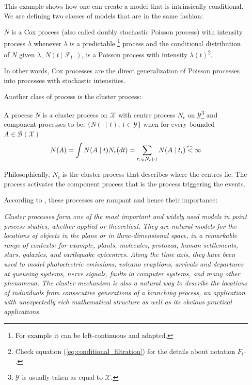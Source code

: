 This example shows how one can create a model that is intrinsically conditional. We are defining two classes of models that are in the same fashion:


\begin{definition}
$N$ is a Cox process (also called doubly stochastic Poisson process) with intensity process $\lambda$ whenever $\lambda$ is a predictable \footnote{For example it can be left-continuous and adapted.} process and the conditional distribution of $N$ given $\lambda$, $N(t \mid \mathcal F_{t^-})$, is a Poisson process with intensity $\lambda (t) $\footnote{Check equation (\ref{eq:conditional_filtration}) for the details about notation $F_{t^-}$.}. 

In other words, Cox processes are the direct generalization of Poisson processes into processes with stochastic intensities.

\end{definition}

Another class of process is the cluster process:

\begin{definition}
\label{def:cluster_process}
A process $ N$ is a cluster process on $\mathcal X$ with centre process $ N_c $ on $\mathcal Y$\footnote{$\mathcal Y$ is usually taken as equal to $\mathcal X$.} and component processes to be: $\{N( \cdot \mid t ), \ t \in \mathcal Y \}$ when for every bounded $A \in \mathcal B( \mathcal X )$
\begin{equation}
N(A) = \int N(A \mid t  ) N_c (dt) = \sum_{ t_i \in N_c(\cdot) } N(A \mid t_i )  \stackrel{\mathclap{\mbox{\normalfont\tiny a.s.}}}{<} \infty 
\end{equation}

Philosophically, $N_c$ is the cluster process that describes where the centres lie. The process activates the component process that is the process triggering the events.


\end{definition}
According to \cite{daley}, these processes are rampant and hence their importance:

\textit{Cluster processes form one of the most important and widely used models in point process studies, whether applied or theoretical. They are natural models for the locations of objects in the plane or in three-dimensional space, in a remarkable range of contexts: for example, plants, molecules, protozoa, human settlements, stars, galaxies, and earthquake epicentres. Along the time axis, they have been used to model photoelectric emissions, volcano eruptions, arrivals and departures at queueing systems, nerve signals, faults in computer systems, and many other phenomena. The cluster mechanism is also a natural way to describe the locations of individuals from consecutive generations of a branching process, an application with unexpectedly rich mathematical structure as well as its obvious practical applications.}

